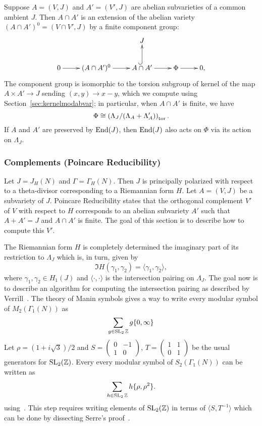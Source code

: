 \documentclass{article}
\begin{document}
Suppose $A = (V,J)$ and $A' = (V', J)$ are abelian subvarieties of a
common ambient $J$.  Then $A\cap A'$ is an extension of the abelian
variety $(A\cap A')^0 = (V\cap V', J)$ by a finite component group:
$$
\xymatrix{
    & & J & & \\
    0\ar[r]& (A\cap A')^0 \ar[r]&  A\cap A'\ar@{^(->}[u] \ar[r]& \Phi\ar[r] & 0,
}
$$
The component group is isomorphic to the torsion subgroup of kernel of
the map $A \times A' \to J$ sending $(x,y)\to x-y$, which we compute
using Section~\ref{sec:kernelmodabvar}; in particular, when $A\cap A'$ is
finite, we have
$$
\Phi \cong \left( \Lambda_J/(\Lambda_A + \Lambda_A')\right)_{\operatorname{tor}}.
$$
If $A$ and $A'$ are preserved by $\operatorname{End}(J)$, then $\operatorname{End}(J)$ also
acts on $\Phi$ via its action on $\Lambda_J$.


\subsubsection{Complements (Poincare Reducibility)}
\label{sec:poincare}

Let $J=J_H(N)$ and $\Gamma=\Gamma_H(N)$. Then $J$ is principally polarized with
respect to a theta-divisor corresponding to a Riemannian form $H$. Let $A=(V,
J)$ be a subvariety of $J$. Poincare Reducibility states that the orthogonal
complement $V'$ of $V$ with respect to $H$ corresponds to an abelian subvariety
$A'$ such that $A+A'=J$ and $A\cap A'$ is finite. The goal of this section is
to describe how to compute this $V'$.

The Riemannian form $H$ is completely determined the imaginary part of its
restriction to $\Lambda_J$ which is, in turn, given by
\[
    \Im H(\gamma_1, \gamma_2) = \langle \gamma_1, \gamma_2 \rangle,
\]
where $\gamma_1, \gamma_2\in H_1(J)$ and $\langle \cdot,\cdot \rangle$ is the
intersection pairing on $\Lambda_J$. The goal now is to describe an algorithm
for computing the intersection pairing as described by Verrill~\cite[\S
4]{verrill:intersection}. The theory of Manin symbols gives a way to write
every modular symbol of $M_2(\Gamma_1(N))$ as
\[
    \sum_{g\in \operatorname{SL}_2{\mathbb{Z}}} g\{0, \infty\}
\]
Let $\rho=(1+i\sqrt{3})/2$ and
$S = \left(
    \begin{smallmatrix}
        0 & -1 \\
        1 & 0
    \end{smallmatrix}
\right)$,
$T = \left(
    \begin{smallmatrix}
        1 & 1 \\
        0 & 1
    \end{smallmatrix}
\right)$ be the usual generators for $\operatorname{SL}_2(\mathbb{Z})$.
Every every modular symbol of $S_2(\Gamma_1(N))$ can be written as
\[
    \sum_{h\in \operatorname{SL}_2{\mathbb{Z}}} h\{\rho, \rho^2\}.
\]
using~\cite[Corollary 4.1]{verrill:intersection}. This step requires writing
elements of $\operatorname{SL}_2(\mathbb{Z})$ in terms of $ \langle S, T^{-1} \rangle$ which can be
done by dissecting Serre's proof~\cite[Chapter 7, Theorem
2]{serre:course_arithmetic}.
\end{document}
